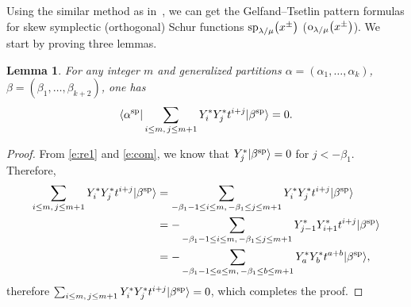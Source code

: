 \documentclass[10pt,a4paper]{amsart}
\numberwithin{equation}{section}
\newtheorem{Lemma}[Theorem]{Lemma}
\begin{document}
Using the similar method as in~\cite{JL2020}, we can get the Gelfand--Tsetlin pattern formulas for skew symplectic (orthogonal) Schur functions ${\rm sp}_{\lambda/\mu}\big(x^{\pm}\big)$ \big(${\rm o}_{\lambda/\mu}\big(x^{\pm}\big)$\big). We start by proving three lemmas.
\begin{Lemma}For any integer $m$ and generalized partitions $\alpha=(\alpha_1,\dots,\alpha_k)$, $\beta=(\beta_1,\dots,\beta_{k+2})$, one has
\begin{align*}
\langle\alpha^{\rm sp}|\sum_{i\leq m,\, j\leq m+1}Y^*_{i}Y^*_{j}t^{i+j}|\beta^{\rm sp}\rangle=0.
\end{align*}
\end{Lemma}
\begin{proof}
From \eqref{e:re1} and \eqref{e:com}, we know that $Y^*_{j}|\beta^{\rm sp}\rangle=0$ for $j<-\beta_1$. Therefore,
\begin{align*}
\sum_{i\leq m,\, j\leq m+1}Y^*_{i}Y^*_{j}t^{i+j}|\beta^{\rm sp}\rangle
&=\sum_{-\beta_1-1\leq i\leq m,\, -\beta_1\leq j\leq m+1}Y^*_{i}Y^*_{j}t^{i+j}|\beta^{\rm sp}\rangle\\
&=-\sum_{-\beta_1-1\leq i\leq m,\, -\beta_1\leq j\leq m+1}Y^*_{j-1}Y^*_{i+1}t^{i+j}|\beta^{\rm sp}\rangle\\
&=-\sum_{-\beta_1-1\leq a\leq m,\, -\beta_1\leq b\leq m+1}Y^*_{a}Y^*_{b}t^{a+b}|\beta^{\rm sp}\rangle,
\end{align*}
therefore $\sum_{i\leq m,\, j\leq m+1}Y^*_{i}Y^*_{j}t^{i+j}|\beta^{\rm sp}\rangle=0$, which completes the proof.
\end{proof}
\end{document}
